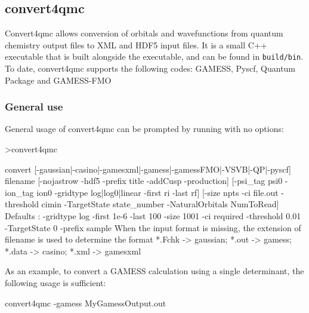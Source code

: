 \subsection{convert4qmc}
\label{sec:convert4qmc}
Convert4qmc allows conversion of orbitals and wavefunctions from
quantum chemistry output files to \qmcpack XML and HDF5 input files.
It is a small C++ executable that is built alongside the \qmcpack
executable, and can be found in \texttt{build/bin}.\\

To date, convert4qmc supports the following codes:
GAMESS\cite{schmidt93}, Pyscf\cite{Sun2018}, Quantum Package\cite{QP}
and GAMESS-FMO\cite{Fedorov2004,schmidt93}


\subsubsection{General use}
General usage of convert4qmc can be prompted by running with no options:

\begin{shade}
>convert4qmc

 convert [-gaussian|-casino|-gamesxml|-gamess|-gamessFMO|-VSVB|-QP|-pyscf]
 filename                                                          
[-nojastrow -hdf5 -prefix title -addCusp -production]                                                                                           
[-psi_tag psi0 -ion_tag ion0 -gridtype log|log0|linear -first ri -last rf]
[-size npts -ci file.out -threshold cimin -TargetState state_number
-NaturalOrbitals NumToRead]                                        
Defaults : -gridtype log -first 1e-6 -last 100 -size 1001 -ci required 
-threshold 0.01 -TargetState 0 -prefix sample                                
When the input format is missing, the  extension of filename is used to determine
the format                                                      
 *.Fchk -> gaussian; *.out -> gamess; *.data -> casino; *.xml -> gamesxml
\end{shade}


As an example, to convert a GAMESS calculation using a single determinant, the following usage is sufficient:\\
\begin{shade}
convert4qmc -gamess MyGamessOutput.out
\end{shade}

